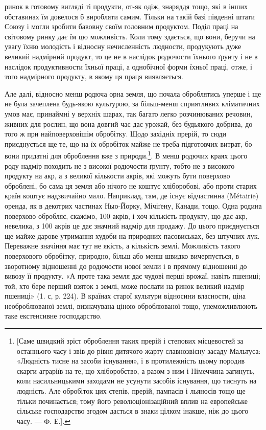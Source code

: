 \parcont{}  %
ринок в готовому вигляді ті продукти, от-як одіж, знаряддя тощо, які в інших
обставинах їм довелося б виробляти самим. Тільки на такій базі південні штати
Союзу і могли зробити бавовну своїм головним продуктом. Поділ праці на світовому
ринку дає їм цю можливість. Коли тому здається, що вони, беручи
на увагу їхню молодість і відносну нечисленність людности, продукують дуже
великий надмірний продукт, то це не в наслідок родючости їхнього ґрунту і не
в наслідок продуктивности їхньої праці, а однобічної форми їхньої праці, отже,
і того надмірного продукту, в якому ця праця виявляється.

Але далі, відносно менш родюча орна земля, що почала оброблятись уперше
і ще не була зачеплена будь-якою культурою, за більш-менш сприятливих
кліматичних умов має, принаймні у верхніх шарах, так багато легко розчинюваних
речовин, живних для рослин, що вона довгий час дає урожай, без будьякого
добрива, до того ж при найповерховішім обробітку. Щодо західніх прерій,
то сюди приєднується ще те, що на їх обробіток майже не треба підготовчих
витрат, бо вони придатні для оброблення вже з природи.\footnote{
[Саме швидкий зріст оброблення таких прерій і степових місцевостей за останнього часу і звів до
рівня дитячого жарту славнозвісну засаду Мальтуса: «Людність тисне на засоби існування», і в
протилежність цьому породив скарги аграріїв на те, що хліборобство, а разом з ним і Німеччина
загинуть, коли насильницькими заходами не усунути засобів існування, що тиснуть на людність. Але
обробіток цих степів, прерій, пампасів і льяносів тощо ще тільки починається; тому його
революціонізаційний вплив на европейське сільське господарство згодом дасться в знаки цілком інакше,
ніж до цього часу. — Ф. Е.].
}. В менш родючих
краях цього роду надмір походить не з високої родючости ґрунту, тобто не з
високого продукту на акр, а з великої кількости акрів, які можуть бути поверхово
оброблені, бо сама ця земля або нічого не коштує хліборобові, або проти
старих країн коштує надзвичайно мало. Наприклад, там, де існує відчастинна
(Métairie) оренда, як в декотрих частинах Ныо-Йорку, Мічіґену, Канади, тощо.
Одна родина поверхово обробляє, скажімо, 100 акрів, і хоч кількість продукту,
що дає акр, невелика, з 100 акрів це дає значний надмір для продажу. До
цього приєднується ще майже дарове утримання худоби на природних пасовиськах,
без штучних лук. Переважне значіння має тут не якість, а кількість землі.
Можливість такого поверхового обробітку, природно, більш або менш швидко
вичерпується, в зворотному відношенні до родючости нової земли і в прямому відношенні до вивозу її
продукту. «А проте така земля дає чудові перші врожаї, навіть
пшениці; той, хто бере перший взяток з землі, може послати на ринок великий
надмір пшениці» (1. с, р. 224). В країнах старої культури відносини власности,
ціна необроблюваної землі, визначувана ціною оброблюваної тощо, унеможливлюють
таке екстенсивне господарство.

